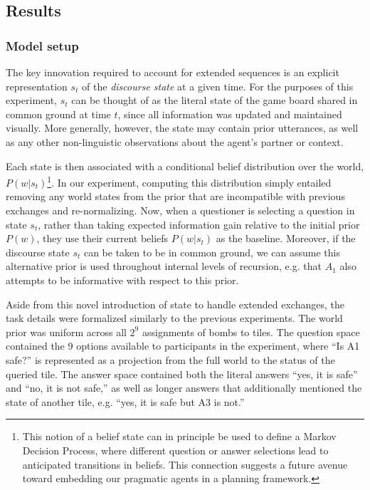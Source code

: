 \documentclass[11pt, floatsintext]{apa6}
\begin{document}
\subsection{Results}

\subsubsection{Model setup}

The key innovation required to account for extended sequences is an explicit representation $s_t$ of the \emph{discourse state} at a given time. 
For the purposes of this experiment, $s_t$ can be thought of as the literal state of the game board shared in common ground at time $t$, since all information was updated and maintained visually.
More generally, however, the state may contain prior utterances, as well as any other non-linguistic observations about the agent's partner or context.

Each state is then associated with a conditional belief distribution over the world, $P(w | s_t)$\footnote{This notion of a belief state can in principle be used to define a Markov Decision Process, where different question or answer selections lead to anticipated transitions in beliefs. This connection suggests a future avenue toward embedding our pragmatic agents in a planning framework.}.
In our experiment, computing this distribution simply entailed removing any world states from the prior that are incompatible with previous exchanges and re-normalizing.
Now, when a questioner is selecting a question in state $s_t$, rather than taking expected information gain relative to the initial prior $P(w)$, they use their current beliefs $P(w | s_t)$ as the baseline.
Moreover, if the discourse state $s_t$ can be taken to be in common ground, we can assume this alternative prior is used throughout internal levels of recursion, e.g. that $A_1$ also attempts to be informative with respect to this prior.

Aside from this novel introduction of state to handle extended exchanges, the task details were formalized similarly to the previous experiments.
The world prior was uniform across all $2^9$ assignments of bombs to tiles. 
The question space contained the 9 options available to participants in the experiment, where ``Is A1 safe?'' is represented as a projection from the full world to the status of the queried tile. 
The answer space contained both the literal answers ``yes, it is safe'' and ``no, it is not safe,'' as well as longer answers that additionally mentioned the state of another tile, e.g. ``yes, it is safe but A3 is not.''
\end{document}
